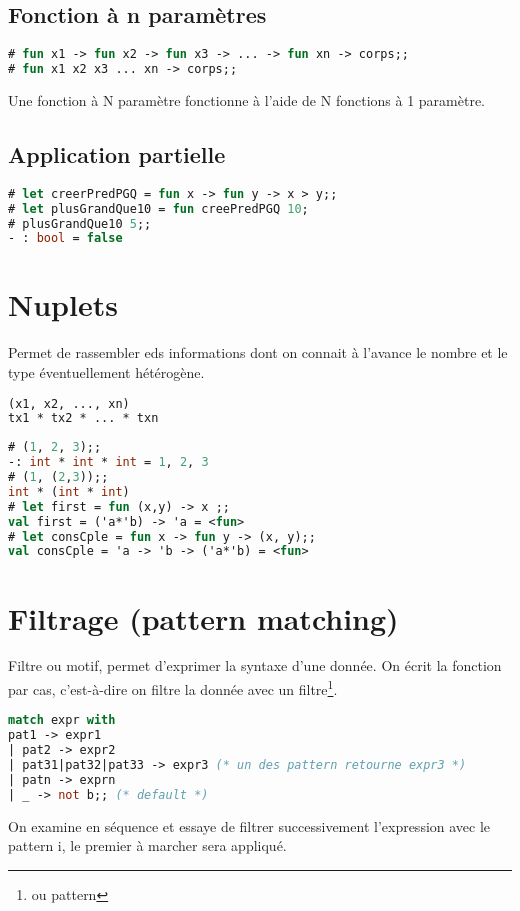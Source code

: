 \documentclass[12pt,a4paper,openany]{book}
\begin{document}
			\subsection{Fonction à n paramètres}
	\begin{lstlisting}[language=Caml, caption=Sytaxe d'une définition de fonction à n paramètres, numbers=none]
# fun x1 -> fun x2 -> fun x3 -> ... -> fun xn -> corps;;
# fun x1 x2 x3 ... xn -> corps;;
\end{lstlisting}

Une fonction à N paramètre fonctionne à l'aide de N fonctions à 1 paramètre.  
\subsection{Application partielle}
	\begin{lstlisting}[language=Caml, caption=Application partielle, numbers=none]
# let creerPredPGQ = fun x -> fun y -> x > y;;
# let plusGrandQue10 = fun creePredPGQ 10;
# plusGrandQue10 5;;
- : bool = false 
\end{lstlisting}
\section{Nuplets}
Permet de rassembler eds informations dont on connait à l'avance le nombre et le type éventuellement hétérogène.
	\begin{lstlisting}[language=Caml, caption=Syntaxe de n-uplets, numbers=none]
(x1, x2, ..., xn)		
tx1 * tx2 * ... * txn
\end{lstlisting}

\begin{exemple}
	\begin{lstlisting}[language=Caml, caption=Exemple n-uplets, numbers=none, framerule=0pt]
# (1, 2, 3);;
-: int * int * int = 1, 2, 3
# (1, (2,3));; 
int * (int * int)
# let first = fun (x,y) -> x ;;
val first = ('a*'b) -> 'a = <fun>
# let consCple = fun x -> fun y -> (x, y);;
val consCple = 'a -> 'b -> ('a*'b) = <fun>
\end{lstlisting}
\end{exemple}

\section{Filtrage (pattern matching)}
	Filtre ou motif, permet d'exprimer la syntaxe d'une donnée. On écrit la fonction par cas, c'est-à-dire on filtre la donnée avec un
	filtre\footnote{ou pattern}.
	\begin{lstlisting}[language=Caml, caption=Syntaxe du filtrage, numbers=none]
match expr with
pat1 -> expr1
| pat2 -> expr2
| pat31|pat32|pat33 -> expr3 (* un des pattern retourne expr3 *)
| patn -> exprn
| _ -> not b;; (* default *)
	\end{lstlisting}
	On examine en séquence et essaye de filtrer successivement l'expression avec le pattern i, le premier à marcher sera appliqué. 
\end{document}
